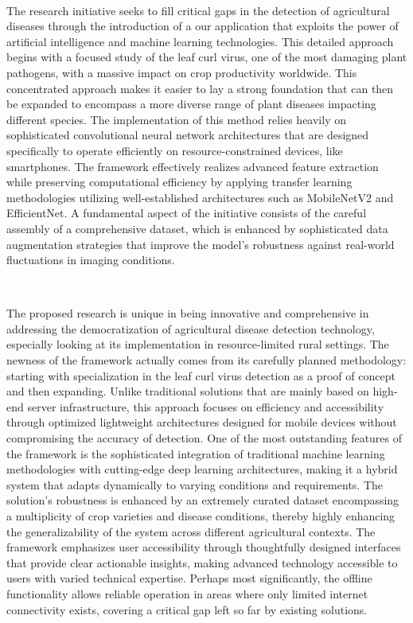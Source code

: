 \

The research initiative seeks to fill critical gaps in the detection of agricultural diseases through the introduction of a our application that exploits the power of artificial intelligence and machine learning technologies. This detailed approach begins with a focused study of the leaf curl virus, one of the most damaging plant pathogens, with a massive impact on crop productivity worldwide. This concentrated approach makes it easier to lay a strong foundation that can then be expanded to encompass a more diverse range of plant diseases impacting different species. The implementation of this method relies heavily on sophisticated convolutional neural network architectures that are designed specifically to operate efficiently on resource-constrained devices, like smartphones. The framework effectively realizes advanced feature extraction while preserving computational efficiency by applying transfer learning methodologies utilizing well-established architectures such as MobileNetV2 and EfficientNet. A fundamental aspect of the initiative consists of the careful assembly of a comprehensive dataset, which is enhanced by sophisticated data augmentation strategies that improve the model's robustness against real-world fluctuations in imaging conditions.

\

The proposed research is unique in being innovative and comprehensive in addressing the democratization of agricultural disease detection technology, especially looking at its implementation in resource-limited rural settings. The newness of the framework actually comes from its carefully planned methodology: starting with specialization in the leaf curl virus detection as a proof of concept and then expanding. Unlike traditional solutions that are mainly based on high-end server infrastructure, this approach focuses on efficiency and accessibility through optimized lightweight architectures designed for mobile devices without compromising the accuracy of detection. One of the most outstanding features of the framework is the sophisticated integration of traditional machine learning methodologies with cutting-edge deep learning architectures, making it a hybrid system that adapts dynamically to varying conditions and requirements. The solution's robustness is enhanced by an extremely curated dataset encompassing a multiplicity of crop varieties and disease conditions, thereby highly enhancing the generalizability of the system across different agricultural contexts. The framework emphasizes user accessibility through thoughtfully designed interfaces that provide clear actionable insights, making advanced technology accessible to users with varied technical expertise. Perhaps most significantly, the offline functionality allows reliable operation in areas where only limited internet connectivity exists, covering a critical gap left so far by existing solutions.

